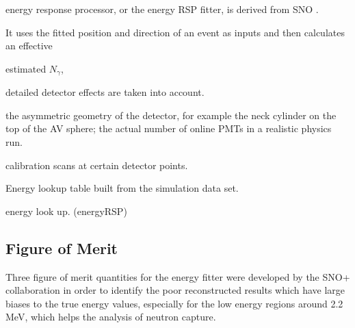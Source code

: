 energy response processor, or the energy RSP fitter, is derived from SNO \cite{boulay2004direct,moffat2001optical}.

It uses the fitted position and direction of an event as inputs and then calculates an effective 

estimated $N_\gamma$,

detailed detector effects are taken into account.

the asymmetric geometry of the detector, for example the neck cylinder on the top of the AV sphere; the actual number of online PMTs in a realistic physics run.

 calibration scans at certain detector points.

Energy lookup table built from the simulation data set.

energy look up\cite{energyRSP}.
(energyRSP)

%	
%	


\subsection{Figure of Merit}\label{sect:energy_fom}
Three figure of merit quantities for the energy fitter were developed by the SNO+ collaboration in order to identify the poor reconstructed results which have large biases to the true energy values, especially for the low energy regions around 2.2 MeV, which helps the analysis of neutron capture\cite{waterunidoc}.


